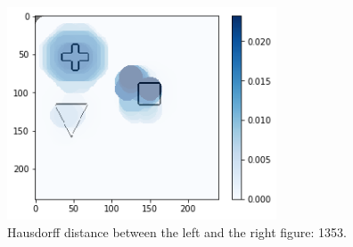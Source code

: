 \begin{figure}[H]
    \centering
    \includegraphics[width=8cm]{chapters/06_hdm/visualization/hdm_raw.png}
    \caption{Hausdorff distance between the left and the right figure: 1353. }
    \label{hdm_visualization_raw}
\end{figure}



